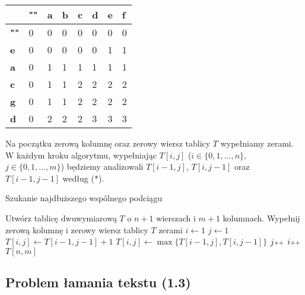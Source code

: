 \begin{table}[H]
	\center
	\begin{tabular}{|l|lllllll|}
		\hline
		& \multicolumn{1}{l|}{\textbf{""}} & \multicolumn{1}{l|}{\textbf{a}} & \multicolumn{1}{l|}{\textbf{b}} & \multicolumn{1}{l|}{\textbf{c}} & \multicolumn{1}{l|}{\textbf{d}} & \multicolumn{1}{l|}{\textbf{e}} & \multicolumn{1}{l|}{\textbf{f}} \\ \hline
		\textbf{""} & 0 & 0 & 0 & 0 & 0 & 0 & 0 \\ \cline{1-1}
		\textbf{e}  & 0 & 0 & 0 & 0 & 0 & 1 & 1 \\ \cline{1-1}
		\textbf{a}  & 0 & 1 & 1 & 1 & 1 & 1 & 1 \\ \cline{1-1}
		\textbf{c}  & 0 & 1 & 1 & 2 & 2 & 2 & 2 \\ \cline{1-1}
		\textbf{g}  & 0 & 1 & 1 & 2 & 2 & 2 & 2 \\ \cline{1-1}
		\textbf{d}  & 0 & 2 & 2 & 2 & 3 & 3 & 3 \\ \cline{1-1}
		\hline
	\end{tabular}
	\caption{}
	\label{tab_zad12}
\end{table}

Na początku zerową kolumnę oraz zerowy wiersz tablicy $T$
wypełniamy zerami. W każdym kroku algorytmu, wypełniając $T[i, j]$
($i \in \{0,1, \dots, n\}$, $j \in \{0,1, \dots, m\}$)
będziemy analizowali $T[i-1, j]$, $T[i, j-1]$ oraz $T[i-1,j-1]$ według ($\ast$).


\begin{algorithm}[H]
	\caption{Szukanie najdłuższego wspólnego podciągu}\label{Zadanie12}
	\begin{algorithmic}[1]
		\State Utwórz tablicę dwuwymiarową $T$ o $n+1$ wierszach i $m+1$ kolumnach.
		\State Wypełnij zerową kolumnę i zerowy wiersz tablicy $T$ zerami
		\State $i \gets 1$
		\State $j \gets 1$
		\State $T[i, j] \gets T[i-1,j-1] + 1$
		\Else
		\State $T[i, j] \gets \max\{T[i-1,j], T[i,j-1]\}$
		\EndIf
		\State $j \pp$
		\EndWhile
		\State $i \pp$
		\EndWhile
		\State \Return $T[n, m]$
		\EndProcedure 
	\end{algorithmic}
\end{algorithm}


\subsection{Problem łamania tekstu (1.3)}
